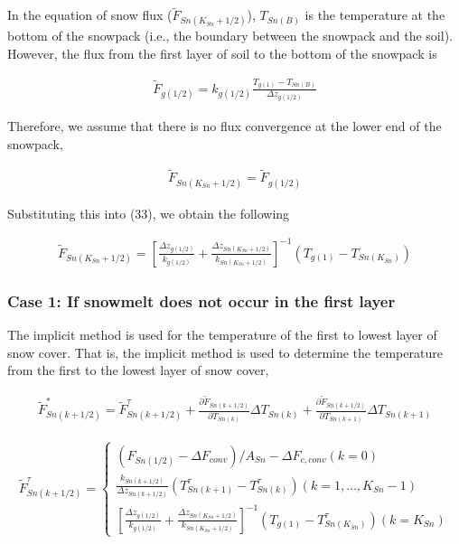 In the equation of snow flux (\(\widetilde{F}_{Sn(K_{Sn}+1/2)}\)),
\(T_{Sn(B)}\) is the temperature at the bottom of the snowpack (i.e.,
the boundary between the snowpack and the soil). However, the flux from
the first layer of soil to the bottom of the snowpack is

\begin{eqnarray}
\widetilde{F}_{g(1/2)} = k_{g(1/2)} \frac{T_{g(1)}-T_{Sn(B)}}{\Delta z_{g(1/2)}}
\end{eqnarray}

Therefore, we assume that there is no flux convergence at the lower end
of the snowpack,

\begin{eqnarray}
\widetilde{F}_{Sn(K_{Sn}+1/2)} =  \widetilde{F}_{g(1/2)}
\end{eqnarray}

Substituting this into (33), we obtain the following

\begin{eqnarray}
\widetilde{F}_{Sn(K_{Sn}+1/2)} =
\left[\frac{\Delta z_{g(1/2)}}{k_{g(1/2)}}
+\frac{\Delta z_{Sn(K_{Sn}+1/2)}}{k_{Sn(K_{Sn}+1/2)}}
\right]^{-1}
(T_{g(1)} - T_{Sn(K_{Sn})})
\end{eqnarray}

\hypertarget{case-1-if-snowmelt-does-not-occur-in-the-first-layer}{%
\subsubsection{Case 1: If snowmelt does not occur in the first
layer}\label{case-1-if-snowmelt-does-not-occur-in-the-first-layer}}

The implicit method is used for the temperature of the first to lowest
layer of snow cover. That is, the implicit method is used to determine
the temperature from the first to the lowest layer of snow cover,

\begin{eqnarray}
 \widetilde{F}_{Sn(k+1/2)}^* = \widetilde{F}_{Sn(k+1/2)}^{\tau}
+\frac{\partial \widetilde{F}_{Sn(k+1/2)}}{\partial T_{Sn(k)}}
 \Delta T_{Sn(k)}
+\frac{\partial \widetilde{F}_{Sn(k+1/2)}}{\partial T_{Sn(k+1)}}
 \Delta T_{Sn(k+1)}
\end{eqnarray}

\begin{eqnarray}
 \widetilde{F}_{Sn(k+1/2)}^{\tau} =
\left\{
\begin{array}{ll}
( F_{Sn(1/2)} - \Delta F_{conv})/A_{Sn} - \Delta F_{c,conv}
 (k=0)\\
\displaystyle{
\frac{k_{Sn(k+1/2)}}{\Delta z_{Sn(k+1/2)}} (T_{Sn(k+1)}^{\tau} - T_{Sn(k)}^{\tau})
}
 (k=1,\ldots,K_{Sn}-1) \\
\displaystyle{
\left[\frac{\Delta z_{g(1/2)}}{k_{g(1/2)}}
+\frac{\Delta z_{Sn(K_{Sn}+1/2)}}{k_{Sn(K_{Sn}+1/2)}}
\right]^{-1}
(T_{g(1)} - T_{Sn(K_{Sn})}^{\tau})
}
 (k=K_{Sn})
\end{array}
\right.
\end{eqnarray}

